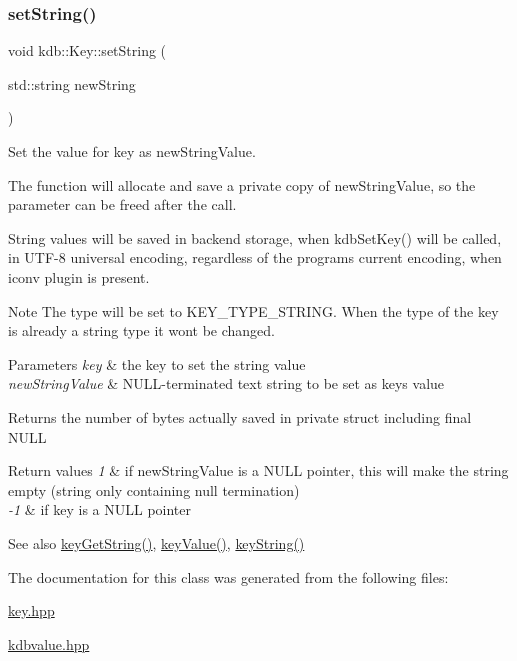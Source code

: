 \subsubsection{\texorpdfstring{set\+String()}{setString()}}
{\footnotesize\ttfamily void kdb\+::\+Key\+::set\+String (\begin{DoxyParamCaption}\item[{std\+::string}]{new\+String }\end{DoxyParamCaption})\hspace{0.3cm}{\ttfamily [inline]}}



Set the value for {\ttfamily key} as {\ttfamily new\+String\+Value}. 

The function will allocate and save a private copy of {\ttfamily new\+String\+Value}, so the parameter can be freed after the call.

String values will be saved in backend storage, when kdb\+Set\+Key() will be called, in U\+T\+F-\/8 universal encoding, regardless of the program\textquotesingle{}s current encoding, when iconv plugin is present.

\begin{DoxyNote}{Note}
The type will be set to K\+E\+Y\+\_\+\+T\+Y\+P\+E\+\_\+\+S\+T\+R\+I\+NG. When the type of the key is already a string type it won\textquotesingle{}t be changed.
\end{DoxyNote}

\begin{DoxyParams}{Parameters}
{\em key} & the key to set the string value \\
\hline
{\em new\+String\+Value} & N\+U\+L\+L-\/terminated text string to be set as {\ttfamily key\textquotesingle{}s} value \\
\hline
\end{DoxyParams}
\begin{DoxyReturn}{Returns}
the number of bytes actually saved in private struct including final N\+U\+LL 
\end{DoxyReturn}

\begin{DoxyRetVals}{Return values}
{\em 1} & if new\+String\+Value is a N\+U\+LL pointer, this will make the string empty (string only containing null termination) \\
\hline
{\em -\/1} & if key is a N\+U\+LL pointer \\
\hline
\end{DoxyRetVals}
\begin{DoxySeeAlso}{See also}
\hyperlink{group__keyvalue_ga41b9fac5ccddafe407fc0ae1e2eb8778}{key\+Get\+String()}, \hyperlink{group__keyvalue_ga6f29609c5da53c6dc26a98678d5752af}{key\+Value()}, \hyperlink{group__keyvalue_ga880936f2481d28e6e2acbe7486a21d05}{key\+String()} 
\end{DoxySeeAlso}


The documentation for this class was generated from the following files\+:\begin{DoxyCompactItemize}
\item 
\hyperlink{key_8hpp}{key.\+hpp}\item 
\hyperlink{kdbvalue_8hpp}{kdbvalue.\+hpp}\end{DoxyCompactItemize}
